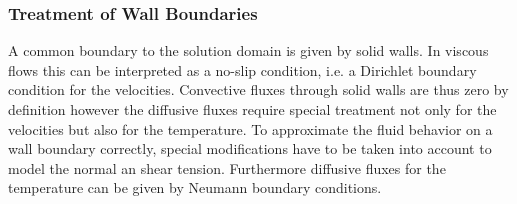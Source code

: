   \subsubsection{Treatment of Wall Boundaries}
  \label{seg:walls}
    
    A common boundary to the solution domain is given by solid walls. In viscous flows this can be interpreted as a no-slip condition, i.e. a Dirichlet boundary condition for the velocities. Convective fluxes through solid walls are thus zero by definition however the diffusive fluxes require special treatment not only for the velocities but also for the temperature. To approximate the fluid behavior on a wall boundary correctly, special modifications have to be taken into account to model the normal an shear tension. Furthermore diffusive fluxes for the temperature can be given by Neumann boundary conditions.

